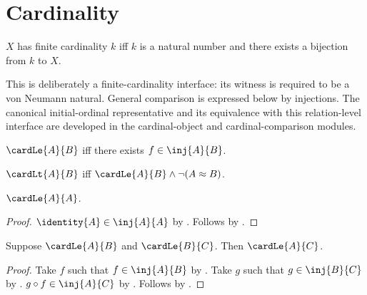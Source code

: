 \section{Cardinality}\label{form_sec_cardinality}











\begin{definition}\label{finite_cardinality}
    $X$ has finite cardinality $k$ iff $k$ is a natural number and
    there exists a bijection from $k$ to $X$.
\end{definition}

This is deliberately a finite-cardinality interface: its witness is required
to be a von Neumann natural. General comparison is expressed below by
injections. The canonical initial-ordinal representative and its equivalence
with this relation-level interface are developed in the cardinal-object and
cardinal-comparison modules.

\begin{definition}\label{cardinal_le}
    $\cardLe{A}{B}$ iff there exists $f\in\inj{A}{B}$.
\end{definition}

\begin{definition}\label{cardinal_lt}
    $\cardLt{A}{B}$ iff $\cardLe{A}{B}\land\lnot(A\approx B)$.
\end{definition}

\begin{proposition}\label{cardinal_le_refl}
    $\cardLe{A}{A}$.
\end{proposition}
\begin{proof}
    $\identity{A}\in\inj{A}{A}$
        by .
    Follows by .
\end{proof}

\begin{proposition}\label{cardinal_le_transitive}
    Suppose $\cardLe{A}{B}$ and $\cardLe{B}{C}$.
    Then $\cardLe{A}{C}$.
\end{proposition}
\begin{proof}
    Take $f$ such that $f\in\inj{A}{B}$ by .
    Take $g$ such that $g\in\inj{B}{C}$ by .
    $g\circ f\in\inj{A}{C}$ by .
    Follows by .
\end{proof}

